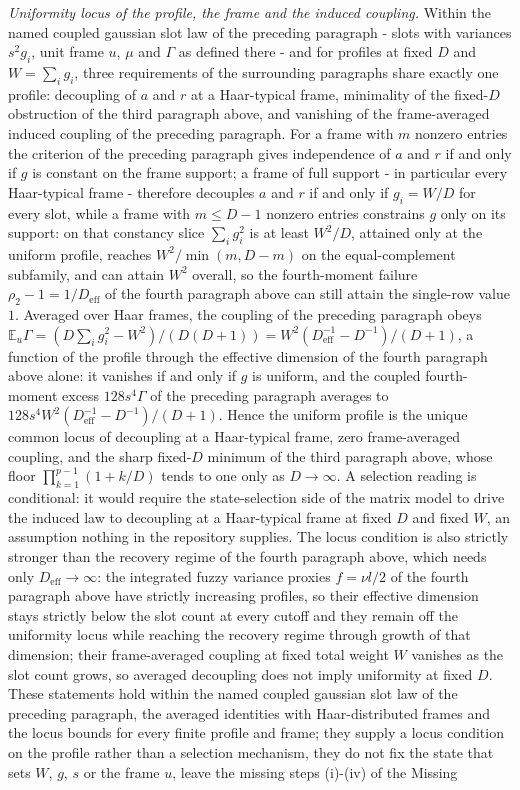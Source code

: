 \emph{Uniformity locus of the profile, the frame and the induced coupling.} Within the named coupled gaussian slot law of the preceding paragraph - slots with variances \(s^{2}g_{i}\), unit frame \(u\), \(\mu\) and \(\Gamma\) as defined there - and for profiles at fixed \(D\) and \(W=\sum_{i}g_{i}\), three requirements of the surrounding paragraphs share exactly one profile: decoupling of \(a\) and \(r\) at a Haar-typical frame, minimality of the fixed-\(D\) obstruction of the third paragraph above, and vanishing of the frame-averaged induced coupling of the preceding paragraph. For a frame with \(m\) nonzero entries the criterion of the preceding paragraph gives independence of \(a\) and \(r\) if and only if \(g\) is constant on the frame support; a frame of full support - in particular every Haar-typical frame - therefore decouples \(a\) and \(r\) if and only if \(g_{i}=W/D\) for every slot, while a frame with \(m\le D-1\) nonzero entries constrains \(g\) only on its support: on that constancy slice \(\sum_{i}g_{i}^{2}\) is at least \(W^{2}/D\), attained only at the uniform profile, reaches \(W^{2}/\min(m,D-m)\) on the equal-complement subfamily, and can attain \(W^{2}\) overall, so the fourth-moment failure \(\rho_{2}-1=1/D_{\mathrm{eff}}\) of the fourth paragraph above can still attain the single-row value \(1\). Averaged over Haar frames, the coupling of the preceding paragraph obeys \(\mathbb{E}_{u}\Gamma=(D\sum_{i}g_{i}^{2}-W^{2})/(D(D+1))=W^{2}(D_{\mathrm{eff}}^{-1}-D^{-1})/(D+1)\), a function of the profile through the effective dimension of the fourth paragraph above alone: it vanishes if and only if \(g\) is uniform, and the coupled fourth-moment excess \(128s^{4}\Gamma\) of the preceding paragraph averages to \(128s^{4}W^{2}(D_{\mathrm{eff}}^{-1}-D^{-1})/(D+1)\). Hence the uniform profile is the unique common locus of decoupling at a Haar-typical frame, zero frame-averaged coupling, and the sharp fixed-\(D\) minimum of the third paragraph above, whose floor \(\prod_{k=1}^{p-1}(1+k/D)\) tends to one only as \(D\to\infty\). A selection reading is conditional: it would require the state-selection side of the matrix model to drive the induced law to decoupling at a Haar-typical frame at fixed \(D\) and fixed \(W\), an assumption nothing in the repository supplies. The locus condition is also strictly stronger than the recovery regime of the fourth paragraph above, which needs only \(D_{\mathrm{eff}}\to\infty\): the integrated fuzzy variance proxies \(f=\nu l/2\) of the fourth paragraph above have strictly increasing profiles, so their effective dimension stays strictly below the slot count at every cutoff and they remain off the uniformity locus while reaching the recovery regime through growth of that dimension; their frame-averaged coupling at fixed total weight \(W\) vanishes as the slot count grows, so averaged decoupling does not imply uniformity at fixed \(D\). These statements hold within the named coupled gaussian slot law of the preceding paragraph, the averaged identities with Haar-distributed frames and the locus bounds for every finite profile and frame; they supply a locus condition on the profile rather than a selection mechanism, they do not fix the state that sets \(W\), \(g\), \(s\) or the frame \(u\), leave the missing steps (i)-(iv) of the Missing 